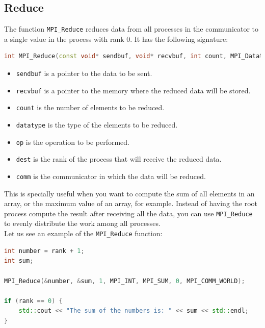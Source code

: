 \subsection{Reduce}

The function \texttt{MPI\_Reduce} reduces data from all processes in the communicator to a single
value in the process with rank 0. It has the following signature:

\begin{lstlisting}[language=C++]
int MPI_Reduce(const void* sendbuf, void* recvbuf, int count, MPI_Datatype datatype, MPI_Op op, int dest, MPI_Comm comm);
\end{lstlisting}

\begin{itemize}
    \item \texttt{sendbuf} is a pointer to the data to be sent.
    \item \texttt{recvbuf} is a pointer to the memory where the reduced data will be stored.
    \item \texttt{count} is the number of elements to be reduced.
    \item \texttt{datatype} is the type of the elements to be reduced.
    \item \texttt{op} is the operation to be performed.
    \item \texttt{dest} is the rank of the process that will receive the reduced data.
    \item \texttt{comm} is the communicator in which the data will be reduced.
\end{itemize}

This is specially useful when you want to compute the sum of all elements in an array, or the
maximum value of an array, for example. Instead of having the root process compute the result
after receiving all the data, you can use \texttt{MPI\_Reduce} to evenly distribute the work
among all processes.\\

Let us see an example of the \texttt{MPI\_Reduce} function:

\begin{lstlisting}[language=C++]
int number = rank + 1;
int sum;

MPI_Reduce(&number, &sum, 1, MPI_INT, MPI_SUM, 0, MPI_COMM_WORLD);

if (rank == 0) {
    std::cout << "The sum of the numbers is: " << sum << std::endl;
}
\end{lstlisting}

\vspace{1em}

